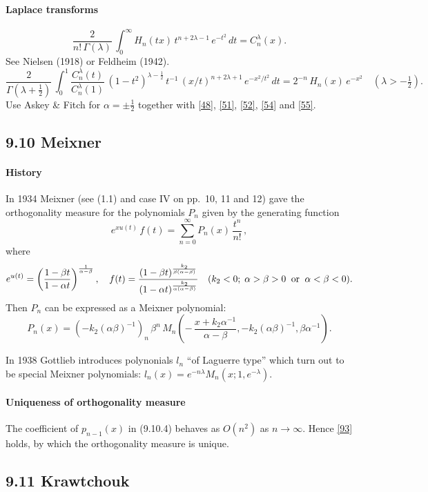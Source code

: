 \documentclass[twoside,11pt]{article}
\newcommand\al\alpha
\newcommand\be\beta
\newcommand\la\lambda
\newcommand\Ga{\Gamma}
\newcommand\half{\frac12}
\newcommand\thalf{\tfrac12}
\newcommand\iy\infty
\begin{document}
\paragraph{Laplace transforms}
\begin{equation}
\frac2{n!\,\Ga(\la)}\,
\int_0^\iy H_n(tx)\,t^{n+2\la-1}\,e^{-t^2}\,dt=C_n^\la(x).
\label{56}
\end{equation}
See Nielsen \cite[p.48, (4) with p.47, (1) and p.28, (10)]{K4} (1918)
or Feldheim \cite[(28)]{K3} (1942).
\begin{equation}
\frac2{\Ga(\la+\thalf)}\,\int_0^1 \frac{C_n^\la(t)}{C_n^\la(1)}\,
(1-t^2)^{\la-\half}\,t^{-1}\,(x/t)^{n+2\la+1}\,e^{-x^2/t^2}\,dt
=2^{-n}\,H_n(x)\,e^{-x^2}\quad(\la>-\thalf).
\label{46}
\end{equation}
Use Askey \& Fitch \cite[(3.29)]{K2} for $\al=\pm\thalf$ together with
\eqref{48}, \eqref{51}, \eqref{52}, \eqref{54} and \eqref{55}.
%
\subsection*{9.10 Meixner}
\paragraph{History}
In 1934 Meixner \cite{406} (see
(1.1) and case IV on pp.~10, 11 and 12) gave the orthogonality
measure for the polynomials $P_n$ given by the generating function
\[
e^{x u(t)}\,f(t)=\sum_{n=0}^\iy P_n(x)\,\frac{t^n}{n!}\,,
\]
where
\[
e^{u(t)}=\left(\frac{1-\be t}{1-\al t}\right)^{\frac1{\al-\be}},\quad
f(t)=\frac{(1-\be t)^{\frac{k_2}{\be(\al-\be)}}}{(1-\al t)^{\frac{k_2}{\al(\al-\be)}}}\quad
(k_2<0;\;\al>\be>0\;\;{\rm or}\;\;\al<\be<0).
\]
Then $P_n$ can be expressed as a Meixner polynomial:
\[
P_n(x)=(-k_2(\al\be)^{-1})_n\,\be^n\,
M_n\left(-\,\frac{x+k_2\al^{-1}}{\al-\be},-k_2(\al\be)^{-1},\be\al^{-1}\right).
\]

In 1938 Gottlieb \cite[\S2]{K1} introduces polynonials $l_n$ ``of Laguerre type''
which turn out to be special Meixner polynomials:
$l_n(x)=e^{-n\la} M_n(x;1,e^{-\la})$.
%
\paragraph{Uniqueness of orthogonality measure}
The coefficient of $p_{n-1}(x)$ in (9.10.4) behaves as $O(n^2)$ as $n\to\iy$.
Hence \eqref{93} holds, by which the orthogonality measure is unique.
%
\subsection*{9.11 Krawtchouk}
%
\end{document}
